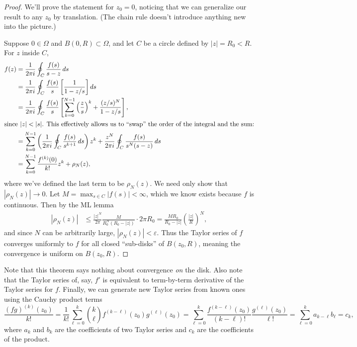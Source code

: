 \documentclass[../m136main.tex]{subfiles}
\begin{document}
\begin{proof}
    We'll prove the statement for $z_0 = 0$, noticing that we can generalize our result to any $z_0$ by translation.
    (The chain rule doesn't introduce anything new into the picture.)

    Suppose $0 \in \Omega$ and $B(0,R) \subset \Omega$, and let $C$ be a circle defined by $|z| = R_0 < R$.
    For $z$ inside $C$,
    \begin{align*}
        f(z) &= \frac{1}{2\pi i} \oint_C \frac{f(s)}{s-z} \,ds \\
        &= \frac{1}{2\pi i} \oint_C \frac{f(s)}{s} \left[ \frac{1}{1 - z / s} \right] ds \\
        &= \frac{1}{2\pi i} \oint_C \frac{f(s)}{s} \left[ \sum_{k=0}^{N-1} \left( \frac{z}{s} \right)^{k} + \frac{(z / s)^{N}}{1 - z / s} \right], \\
        \intertext{since $|z| < |s|$. This effectively allows us to ``swap'' the order of the integral and the sum:}
        &= \sum_{k=0}^{N-1} \left( \frac{1}{2\pi i} \oint_C \frac{f(s)}{s^{k+1}} \,ds \right) z^{k} + \frac{z^{N}}{2\pi i} \oint_C \frac{f(s)}{s^{N} (s-z)} \,ds \\
        &= \sum_{k=0}^{N-1} \frac{f^{(k)}(0)}{k!} z^{k} + \rho_N(z),
    \end{align*}
    where we've defined the last term to be $\rho_N(z)$.
    We need only show that $|\rho_N(z)| \to 0$.
    Let $M = \max_{s \in C} |f(s)| < \infty$, which we know exists because $f$ is continuous.
    Then by the ML lemma
    \begin{align*}
        |\rho_N(z)| &\leq \frac{|z|^{N}}{2\pi} \frac{M}{R_0^{N} (R_0 - |z|)} \cdot 2\pi R_0 = \frac{MR_0}{R_0 - |z|} \left( \frac{|z|}{R} \right)^{N},
    \end{align*}
    and since $N$ can be arbitrarily large, $|\rho_N(z)| < \varepsilon$.
    Thus the Taylor series of $f$ converges uniformly to $f$ for all closed ``sub-disks'' of $B(z_0, R)$, meaning the convergence is uniform on $B(z_0, R)$.
\end{proof}

Note that this theorem says nothing about convergence \textit{on} the disk.
Also note that the Taylor series of, say, $f'$ is equivalent to term-by-term derivative of the Taylor series for $f$.
Finally, we can generate new Taylor series from known ones using the Cauchy product terms
\[ \frac{(fg)^{(k)}(z_0)}{k!} = \frac{1}{k!} \sum_{\ell = 0}^{k} \binom{k}{\ell} f^{(k - \ell)}(z_0) g^{(\ell)}(z_0) = \sum_{\ell = 0}^{k} \frac{f^{(k - \ell)}(z_0)}{(k - \ell)!} \frac{g^{(\ell)}(z_0)}{\ell !} = \sum_{\ell = 0}^{k} a_{k - \ell} b_\ell = c_k, \]
where $a_k$ and $b_k$ are the coefficients of two Taylor series and $c_k$ are the coefficients of the product.
\end{document}
